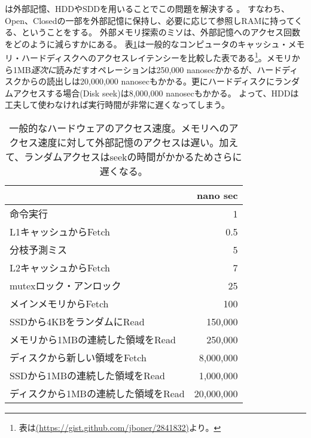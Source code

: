 は外部記憶、HDDやSDDを用いることでこの問題を解決する \cite{chiang1995external}。
すなわち、Open、Closedの一部を外部記憶に保持し、必要に応じて参照しRAMに持ってくる、ということをする。
外部メモリ探索のミソは、外部記憶へのアクセス回数をどのように減らすかにある。
表\ref{tbl:latency}は一般的なコンピュータのキャッシュ・メモリ・ハードディスクへのアクセスレイテンシーを比較した表である\footnote{表は\url{(https://gist.github.com/jboner/2841832)}より。}。メモリから1MB{\it 逐次に}読みだすオペレーションは250,000 nanosecかかるが、ハードディスクからの読出しは20,000,000 nanosecもかかる。更にハードディスクにランダムアクセスする場合(Disk seek)は8,000,000 nanosecもかかる。
よって、HDDは工夫して使わなければ実行時間が非常に遅くなってしまう。%

\begin{table}
\centering
\caption{一般的なハードウェアのアクセス速度。メモリへのアクセス速度に対して外部記憶のアクセスは遅い。加えて、ランダムアクセスはseekの時間がかかるためさらに遅くなる。 }
\label{tbl:latency}
\begin{tabular}{|l|r|}
		   & nano sec \\ \hline
	命令実行 & 1 \\
	L1キャッシュからFetch & 0.5 \\
	分枝予測ミス 		& 5 \\
	L2キャッシュからFetch & 7 \\
	mutexロック・アンロック			& 25 \\
	メインメモリからFetch  	& 100 \\
	SSDから4KBをランダムにRead         & 150,000 \\
	メモリから1MBの連続した領域をRead & 250,000 \\
	ディスクから新しい領域をFetch & 8,000,000 \\
	SSDから1MBの連続した領域をRead		& 1,000,000 \\
	ディスクから1MBの連続した領域をRead 	& 20,000,000 \\
	
\end{tabular}
\end{table}


